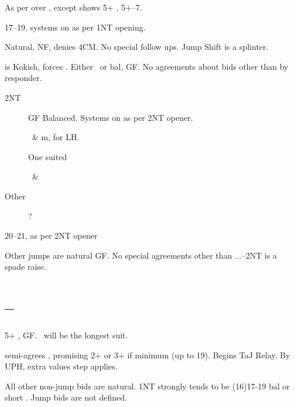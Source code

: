 \documentclass[tom-ari]{subfile}
\begin{document}
	\begin{bidbox}{}
		As per over , except  shows 5+ \heartsuit, 5+--7.
	\end{bidbox}
	
	\begin{bidbox}{}
		17--19, systems on as per 1NT opening.
	\end{bidbox}

	\begin{bidbox}{}
		Natural, NF, denies 4CM.  No special follow ups. Jump Shift is a splinter.
	\end{bidbox}

	\begin{bidbox}{}
		 is Kokish, forces .  Either \heartsuit ~or bal, GF.  No agreements about bids other than  by responder.
		\begin{description}
		\item[2NT] GF Balanced.  Systems on as per 2NT opener.
		\item[] \heartsuit ~\& m,  for LH.
		\item[] One suited \heartsuit
		\item[] \heartsuit ~\& \spadesuit
		\item[Other] ?
		\end{description} 
	\end{bidbox}

	\begin{bidbox}{}
		20--21, as per 2NT opener
	\end{bidbox}

	\begin{bidbox}{}
		Other jumps are natural GF.  No special agreements other than ...--2NT is a spade raise.
	\end{bidbox}


	\section[1C--1H]{--}
	
	5+ \spadesuit, GF.  \spadesuit ~will be the longest suit.
	
	 semi-agrees \spadesuit, promising 2+ or 3+ if minimum (up to 19).  Begins TaJ Relay.  By UPH, extra values step applies.
	
	All other non-jump bids are natural.  1NT strongly tends to be (16)17-19 bal or short \spadesuit.  Jump bids are not defined.
	
\end{document}
